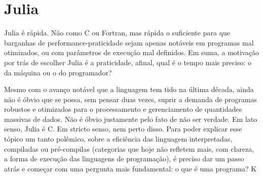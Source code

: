\chapter{Julia}

\begin{quotation}
    
\end{quotation}

Julia é rápida. Não como C ou Fortran, mas rápida o suficiente para que barganhas de performance-praticidade sejam apenas notáveis em programas mal otimizados, ou com parâmetros de execução mal definidos. Em suma, a motivação por trás de escolher Julia é a praticidade, afinal, qual é o tempo mais preciso: o da máquina ou o do programador?

Mesmo com o avanço notável que a linguagem tem tido na última década, ainda não é óbvio que se possa, sem pensar duas vezes, suprir a demanda de programas robustos e otimizados para o processamento e gerenciamento de quantidades massivas de dados. Não é óbvio justamente pelo fato de não ser verdade. Em lato senso, Julia é C. Em stricto senso, nem perto disso. Para poder explicar esse tópico um tanto polêmico, sobre a eficiência das linguagem interpretadas, compiladas ou pré-compilas (categorias que hoje não refletem mais, com clareza, a forma de execução das linguagens de programação), é preciso dar um passo atrás e começar com uma pergunta mais fundamental: o que é uma programa?
K